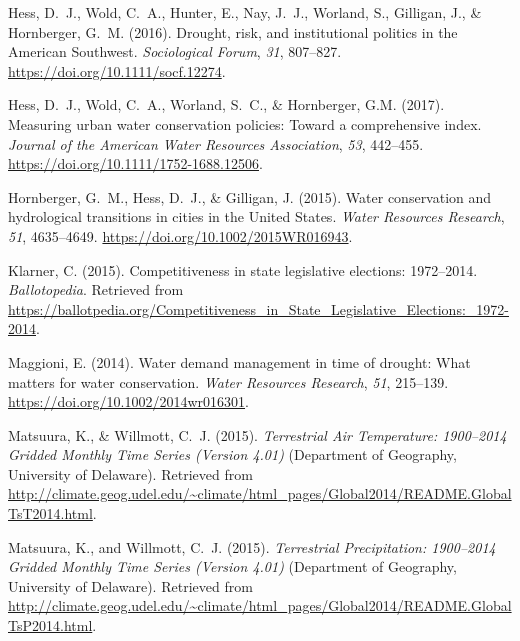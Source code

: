 \documentclass[draft]{agujournal}\usepackage{knitr}
\begin{document}
\begin{thebibliography}{33}
  Hess, D.~J., Wold, C.~A., Hunter, E., Nay, J.~J., Worland, S., Gilligan, J.,
  \& Hornberger, G.~M. (2016).
  Drought, risk, and institutional politics in the {A}merican {S}outhwest.
  \textit{Sociological Forum}, \textit{31}, 807--827.
  \url{https://doi.org/10.1111/socf.12274}.

  Hess, D.~J., Wold, C.~A., Worland, S.~C., \& Hornberger, G.M. (2017).
  Measuring urban water conservation policies: Toward a comprehensive index.
  \textit{Journal of the American Water Resources Association},
  \textit{53}, 442--455.
  \url{https://doi.org/10.1111/1752-1688.12506}.

  Hornberger, G.~M., Hess, D.~J., \& Gilligan, J. (2015).
  Water conservation and hydrological transitions in cities in the {U}nited {S}tates.
  \textit{Water Resources Research}, \textit{51}, 4635--4649.
  \url{https://doi.org/10.1002/2015WR016943}.

  Klarner, C. (2015).
  Competitiveness in state legislative elections: 1972--2014.
  \textit{Ballotopedia}.
  Retrieved from
  \url{https://ballotpedia.org/Competitiveness_in_State_Legislative_Elections:_1972-2014}.

  Maggioni, E. (2014).
  Water demand management in time of drought: {W}hat matters for water conservation.
  \textit{Water Resources Research}, \textit{51}, 215--139.
  \url{https://doi.org/10.1002/2014wr016301}.

  Matsuura, K., \& Willmott, C.~J. (2015{}).
  \textit{Terrestrial Air Temperature: 1900--2014 Gridded Monthly Time Series (Version 4.01)\/}
  (Department of  Geography, University of Delaware).
  Retrieved from
  \url{http://climate.geog.udel.edu/~climate/html_pages/Global2014/README.GlobalTsT2014.html}.

  Matsuura, K., and Willmott, C.~J. (2015{}).
  \textit{Terrestrial Precipitation: 1900--2014 Gridded Monthly Time Series (Version 4.01)\/}
  (Department of  Geography, University of Delaware).
  Retrieved from
  \url{http://climate.geog.udel.edu/~climate/html_pages/Global2014/README.GlobalTsP2014.html}.


\end{thebibliography}
\end{document}
